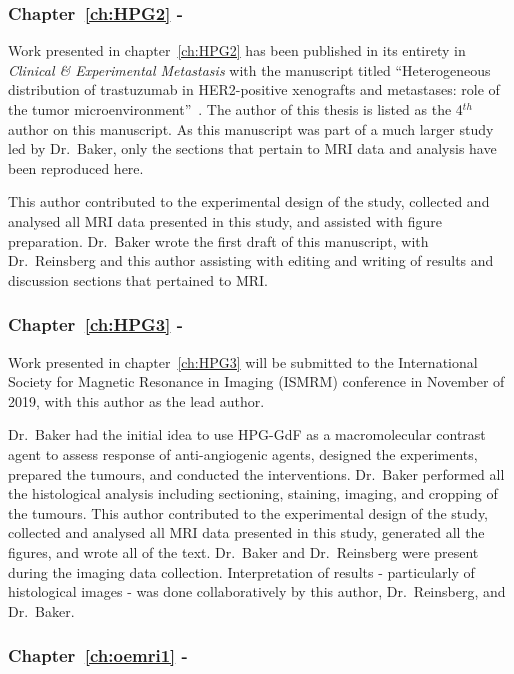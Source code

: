 \subsubsection{Chapter~\ref{ch:HPG2} - }

Work presented in chapter~\ref{ch:HPG2} has been published in its entirety in \emph{Clinical \& Experimental Metastasis} with the manuscript titled ``Heterogeneous distribution of trastuzumab in HER2-positive xenografts and metastases: role of the tumor microenvironment''~\cite{Baker:2018ex}.
The author of this thesis is listed as the 4$^{th}$ author on this manuscript.
As this manuscript was part of a much larger study led by Dr.\ Baker, only the sections that pertain to MRI data and analysis have been reproduced here.

This author contributed to the experimental design of the study, collected and analysed all MRI data presented in this study, and assisted with figure preparation.
Dr.\ Baker wrote the first draft of this manuscript, with Dr.\ Reinsberg and this author assisting with editing and writing of results and discussion sections that pertained to MRI.

\subsubsection{Chapter~\ref{ch:HPG3} - }

Work presented in chapter~\ref{ch:HPG3} will be submitted to the International Society for Magnetic Resonance in Imaging (ISMRM) conference in November of 2019, with this author as the lead author.

Dr.\ Baker had the initial idea to use \acs{HPG-GdF} as a macromolecular contrast agent to assess response of anti-angiogenic agents, designed the experiments, prepared the tumours, and conducted the interventions.
Dr.\ Baker performed all the histological analysis including sectioning, staining, imaging, and cropping of the tumours.
This author contributed to the experimental design of the study, collected and analysed all MRI data presented in this study, generated all the figures, and wrote all of the text. 
Dr.\ Baker and Dr.\ Reinsberg were present during the imaging data collection.
Interpretation of results - particularly of histological images - was done collaboratively by this author, Dr.\ Reinsberg, and Dr.\ Baker.

\subsubsection{Chapter~\ref{ch:oemri1} - }

